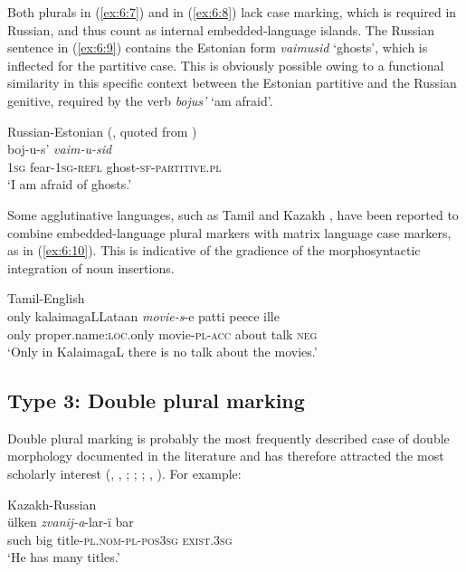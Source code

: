 \noindent Both plurals in (\ref{ex:6:7}) and in (\ref{ex:6:8}) lack case marking, which is required in Russian, and thus count as internal embedded-language islands. The Russian sentence in (\ref{ex:6:9}) contains the Estonian form \textit{vaimusid} ‘ghosts’, which is inflected for the partitive case. This is obviously possible owing to a functional similarity in this specific context between the Estonian partitive and the Russian genitive, required by the verb \textit{bojus’} ‘am afraid’.

\ea
\label{ex:6:9}
Russian-Estonian (\citealt[117]{muerkhein}, quoted from \citealt[437]{verschik04})\\
 {boj-u-s'} \textit{vaim-u-sid}\\
	\textsc{1sg} fear-\textsc{1sg-refl} ghost-\textsc{sf-partitive.pl}\\
\glt `I am afraid of ghosts.'
\z

Some agglutinative languages, such as Tamil and Kazakh \citep[67]{muhamedowa-untersuchung-2006}, have been reported to combine  embedded-language plural markers with matrix language case markers, as in (\ref{ex:6:10}). This is indicative of the gradience of the morphosyntactic integration of noun insertions.

\ea
\label{ex:6:10}
Tamil-English \citep[81]{sankoff-et-al-1990}\\
\gll only {kalaimagaLLataan} \textit{movie-s}-e {patti} {peece} {ille}\\
	only proper.name:\textsc{loc}.only movie-\textsc{pl-acc} about talk \textsc{neg}\\
\glt `Only in KalaimagaL there is no talk about the movies.'
\z

\subsection{Type 3: Double plural marking}

\noindent Double plural marking is probably the most frequently described case of double morphology documented in the literature and has therefore attracted the most scholarly interest (\citealt[96]{backus-patterns-1992}, \citeyear[151]{backus-two-1996}, \citeyear[98--99]{backus-evidence-1999}; \citealt[90--91]{boumans-syntax-1998}; \citealt[152--156]{muhamedowa-untersuchung-2006}; \citealt[132--135]{myers-scotton-duelling-1993}, \citealt{myers-scotton-matching-1995}). For example:

\ea
\label{ex:6:11}
Kazakh-Russian \citep[152]{muhamedowa-untersuchung-2006}\\
 {ülken} \textit{zvanij-a}-lar-ï {bar}\\
	such big title-\textsc{pl.nom-pl-pos3sg} \textsc{exist.3sg}\\
\glt `He has many titles.'
\z

